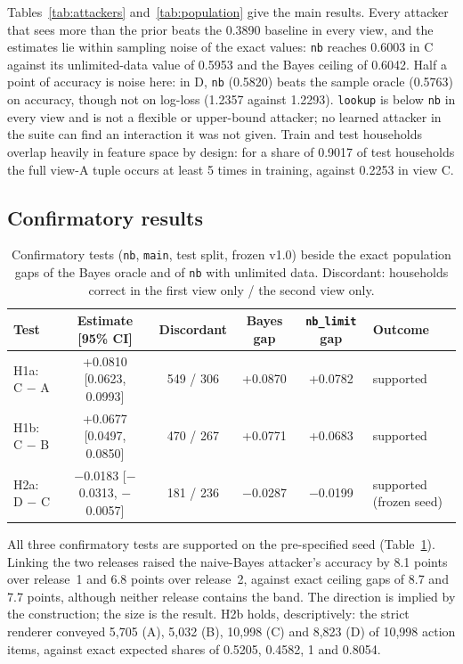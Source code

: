 \documentclass[11pt]{article}
\newcommand{\code}[1]{\texttt{#1}}
\begin{document}
Tables~\ref{tab:attackers} and~\ref{tab:population} give the main results. Every attacker that sees more than the prior beats the 0.3890 baseline in every view, and the estimates lie within sampling noise of the exact values: \code{nb} reaches 0.6003 in C against its unlimited-data value of 0.5953 and the Bayes ceiling of 0.6042. Half a point of accuracy is noise here: in D, \code{nb} (0.5820) beats the sample oracle (0.5763) on accuracy, though not on log-loss (1.2357 against 1.2293). \code{lookup} is below \code{nb} in every view and is not a flexible or upper-bound attacker; no learned attacker in the suite can find an interaction it was not given. Train and test households overlap heavily in feature space by design: for a share of 0.9017 of test households the full view-A tuple occurs at least 5 times in training, against 0.2253 in view C.

\subsection{Confirmatory results}
\label{sec:confirmatory}

\begin{table}[htbp]
\centering\footnotesize
\caption{Confirmatory tests (\code{nb}, \code{main}, test split, frozen v1.0) beside the exact population gaps of the Bayes oracle and of \code{nb} with unlimited data. Discordant: households correct in the first view only / the second view only.}
\label{tab:confirmatory}
\begin{tabular}{@{}lccccl@{}}
\toprule
Test & Estimate [95\% CI] & Discordant & Bayes gap & \code{nb\_limit} gap & Outcome \\
\midrule
H1a: C $-$ A & +0.0810 [0.0623, 0.0993] & 549 / 306 & +0.0870 & +0.0782 & supported \\
H1b: C $-$ B & +0.0677 [0.0497, 0.0850] & 470 / 267 & +0.0771 & +0.0683 & supported \\
H2a: D $-$ C & $-$0.0183 [$-$0.0313, $-$0.0057] & 181 / 236 & $-$0.0287 & $-$0.0199 & supported (frozen seed) \\
\bottomrule
\end{tabular}
\end{table}

All three confirmatory tests are supported on the pre-specified seed (Table~\ref{tab:confirmatory}). Linking the two releases raised the naive-Bayes attacker's accuracy by 8.1 points over release~1 and 6.8 points over release~2, against exact ceiling gaps of 8.7 and 7.7 points, although neither release contains the band. The direction is implied by the construction; the size is the result. H2b holds, descriptively: the strict renderer conveyed 5,705 (A), 5,032 (B), 10,998 (C) and 8,823 (D) of 10,998 action items, against exact expected shares of 0.5205, 0.4582, 1 and 0.8054.
\end{document}
